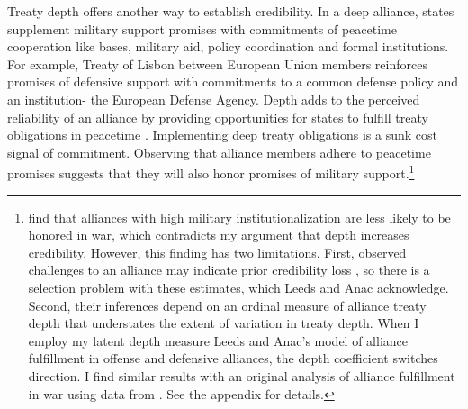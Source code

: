 \documentclass[12pt]{article}
\begin{document}


Treaty depth offers another way to establish credibility.
In a deep alliance, states supplement military support promises with commitments of peacetime cooperation like bases, military aid, policy coordination and formal institutions. 
For example, Treaty of Lisbon between European Union members reinforces promises of defensive support with commitments to a common defense policy and an institution- the European Defense Agency. 
Depth adds to the perceived reliability of an alliance by providing opportunities for states to fulfill treaty obligations in peacetime \citep{Morrow1994}. 
Implementing deep treaty obligations is a sunk cost signal of commitment.
Observing that alliance members adhere to peacetime promises suggests that they will also honor promises of military support.\footnote{\citet{LeedsAnac2005} find that alliances with high military institutionalization are less likely to be honored in war, which contradicts my argument that depth increases credibility. 
However, this finding has two limitations. 
First, observed challenges to an alliance may indicate prior credibility loss \citep{Smith1995}, so there is a selection problem with these estimates, which Leeds and Anac acknowledge. 
Second, their inferences depend on an ordinal measure of alliance treaty depth that understates the extent of variation in treaty depth. 
When I employ my latent depth measure Leeds and Anac's model of alliance fulfillment in offense and defensive alliances, the depth coefficient switches direction. 
I find similar results with an original analysis of alliance fulfillment in war using data from \citet{BerkemeierFuhrmann2018}.
See the appendix for details.} 
\end{document}
